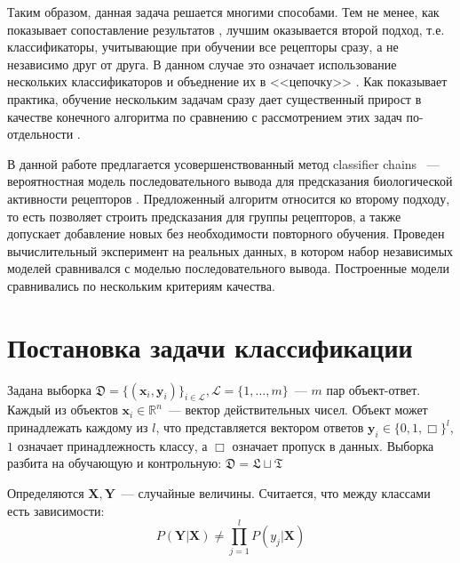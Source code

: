 \documentclass{ITaSconf}
\newcommand{\x}{\mathbf{x}}
\newcommand{\y}{\mathbf{y}}
\newcommand{\X}{\mathbf{X}}
\newcommand{\Y}{\mathbf{Y}}
\begin{document}
Таким образом, данная задача решается многими способами. Тем не менее, как показывает сопоставление результатов \cite{popova1}, лучшим оказывается второй подход, т.е. классификаторы, учитывающие при обучении все рецепторы сразу, а не независимо друг от друга. В данном случае это означает использование нескольких классификаторов и объеднение их в <<цепочку>> \cite{elena, weiweicc, jesse}. Как показывает практика, обучение нескольким задачам сразу дает существенный прирост в качестве конечного алгоритма по сравнению с рассмотрением этих задач по-отдельности \cite{weiwei2010, maxime2015, jesse}.

В данной работе предлагается усовершенствованный метод classifier chains \cite{jesse}~--- вероятностная модель последовательного вывода для предсказания биологической активности рецепторов \cite{enrique, weiwei2010}. Предложенный алгоритм относится ко второму подходу, то есть позволяет строить предсказания для группы рецепторов, а также допускает добавление новых без необходимости повторного обучения. Проведен вычислительный эксперимент на реальных данных, в котором набор независимых моделей сравнивался с моделью последовательного вывода. Построенные модели сравнивались по нескольким критериям качества.
\section{Постановка задачи классификации}
Задана выборка $\mathfrak{D}=\{(\x_i,\y_i)\}_{i\in \mathcal{L}}, \mathcal{L}=\{1,\dots, m\}$~--- $m$ пар объект-ответ. Каждый из объектов $\x_i\in \mathbb{R}^n$~--- вектор действительных чисел. Объект может принадлежать каждому из $l$, что представляется вектором ответов $\y_i\in \{0,1,\Box\}^l$, $1$ означает принадлежность классу, а $\Box$ означает пропуск в данных. Выборка разбита на обучающую и контрольную: $\mathfrak{D}=\mathfrak{L}\sqcup\mathfrak{T}$


Определяются $\X, \Y$~--- случайные величины.
Считается, что между классами есть зависимости:
$$P(\Y|\X)\neq \prod_{j=1}^l P(y_j|\X)$$

\end{document}
